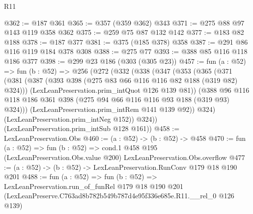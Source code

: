 \begin{lexlean}{R11}
\begin{coremodule}
@362 := @187 @361
@365 := @357 (@359 @362) @343
@371 := @275 @88 @97 @143 @119 @358 @362
@375 := @259 @75 @87 @132 @142
@377 := @183 @82 @188
@378 := @187 @377
@381 := @375 (@185 @378) @358
@387 := @291 @86 @116 @119 @184 @378 @308
@388 := @275 @77
@393 := @388 @85 @116 @118 @186 @377
@398 := @299 @23 @186 (@303 (@305 @23))
@457 := fun (a : @52) =>
  fun (b : @52) =>
  @256
    (@272
      (@332
        (@338
          (@347
            (@353
              (@365
                (@371
                  (@381
                    (@387 (@393 @398 (@275 @83 @66 @116 @116 @82 @188 (@319 @82) @324)))
                    (LexLeanPreservation.prim_intQuot @126 @139 @81))
                  (@388
                    @96
                    @116
                    @118
                    @186
                    @361
                    @398
                    (@275 @94 @66 @116 @116 @93 @188 (@319 @93) @324)))
                (LexLeanPreservation.prim_intRem @141 @139 @92))
              @324)
            (LexLeanPreservation.prim_intNeg @152))
          @324))
      (LexLeanPreservation.prim_intSub @128 @161))
@458 := LexLeanPreservation.Obs
@460 := (a : @52) -> (b : @52) -> @458
@470 := fun (a : @52) =>
  fun (b : @52) =>
  cond.{1} @458 @195 (LexLeanPreservation.Obs.value @200) LexLeanPreservation.Obs.overflow
@477 := (a : @52) -> (b : @52) -> LexLeanPreservation.RunConv @179 @18 @190 @201
@488 := fun (a : @52) =>
  fun (b : @52) =>
  LexLeanPreservation.run_of_funRel
    @179
    @18
    @190
    @201
    (LexLeanPreserve.C763ad8b782b549b787d4e95f336e685e.R11.__rel_0 @126 @139)
\end{coremodule}
\end{lexlean}
